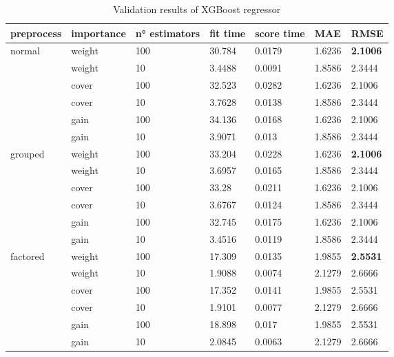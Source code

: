 \begin{table}[H]
    \centering
    \begin{tabular}{lll|llll}
    \toprule
    \textbf{preprocess} & \textbf{importance} & \textbf{n° estimators} & \textbf{fit time} & \textbf{score time} & \textbf{MAE} & \textbf{RMSE} \\ \midrule
    \multirow{6}{*}{normal}     & weight & 100 & 30.784 & 0.0179 & 1.6236 & \textbf{2.1006} \\
                                & weight & 10  & 3.4488 & 0.0091 & 1.8586 & 2.3444          \\
                                & cover  & 100 & 32.523 & 0.0282 & 1.6236 & 2.1006          \\
                                & cover  & 10  & 3.7628 & 0.0138 & 1.8586 & 2.3444          \\
                                & gain   & 100 & 34.136 & 0.0168 & 1.6236 & 2.1006          \\
                                & gain   & 10  & 3.9071 & 0.013  & 1.8586 & 2.3444          \\
                                \midrule
    \multirow{6}{*}{grouped}    & weight & 100 & 33.204 & 0.0228 & 1.6236 & \textbf{2.1006} \\
                                & weight & 10  & 3.6957 & 0.0165 & 1.8586 & 2.3444          \\
                                & cover  & 100 & 33.28  & 0.0211 & 1.6236 & 2.1006          \\
                                & cover  & 10  & 3.6767 & 0.0124 & 1.8586 & 2.3444          \\
                                & gain   & 100 & 32.745 & 0.0175 & 1.6236 & 2.1006          \\
                                & gain   & 10  & 3.4516 & 0.0119 & 1.8586 & 2.3444          \\
                                \midrule
    \multirow{6}{*}{factored}   & weight & 100 & 17.309 & 0.0135 & 1.9855 & \textbf{2.5531} \\
                                & weight & 10  & 1.9088 & 0.0074 & 2.1279 & 2.6666          \\
                                & cover  & 100 & 17.352 & 0.0141 & 1.9855 & 2.5531          \\
                                & cover  & 10  & 1.9101 & 0.0077 & 2.1279 & 2.6666          \\
                                & gain   & 100 & 18.898 & 0.017  & 1.9855 & 2.5531          \\
                                & gain   & 10  & 2.0845 & 0.0063 & 2.1279 & 2.6666          \\
    \bottomrule
    \end{tabular}
    \caption{Validation results of XGBoost regressor}
    \label{tab:val_xgb}
    \end{table}
